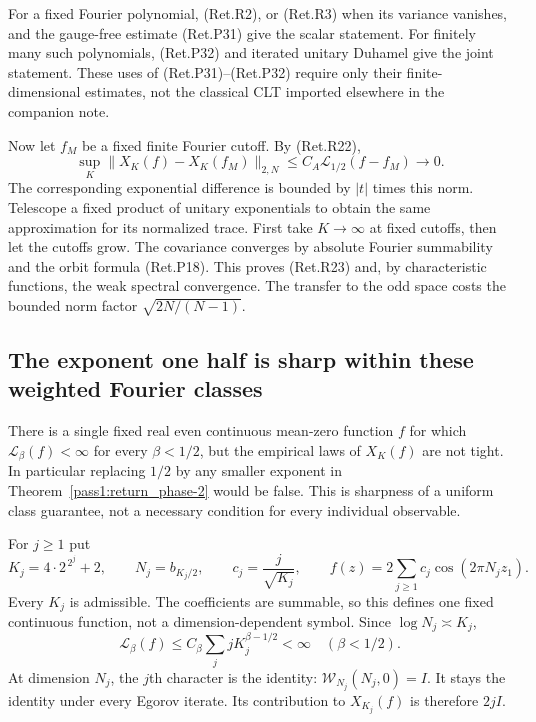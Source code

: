 For a fixed Fourier polynomial, (Ret.R2), or (Ret.R3) when its variance vanishes,
and the gauge-free estimate (Ret.P31) give the scalar statement.
For finitely many such polynomials,
(Ret.P32) and iterated unitary Duhamel give the joint statement.
These uses of (Ret.P31)--(Ret.P32) require only their finite-dimensional estimates,
not the classical CLT imported elsewhere in the companion note.

Now let \(f_M\) be a fixed finite Fourier cutoff. By (Ret.R22),
\[
 \sup_K\|X_K(f)-X_K(f_M)\|_{2,N}
                          \le C_A\mathcal L_{1/2}(f-f_M)\to0.
\]
The corresponding exponential difference is bounded by \(|t|\) times
this norm. Telescope a fixed product of unitary exponentials to obtain
the same approximation for its normalized trace.
First take \(K\to\infty\) at fixed cutoffs, then let the cutoffs grow.
The covariance converges by absolute Fourier summability and the
orbit formula (Ret.P18). This proves (Ret.R23) and, by characteristic functions,
the weak spectral convergence. The transfer to the odd space costs
the bounded norm factor \(\sqrt{2N/(N-1)}\).

\hypertarget{the-exponent-one-half-is-sharp-within-these-weighted-fourier-classes}{%
\subsection{The exponent one half is sharp within these weighted Fourier classes}\label{the-exponent-one-half-is-sharp-within-these-weighted-fourier-classes}}

\begin{theorem}\label{pass1:return_phase-3} There is a single fixed real even continuous mean-zero
function \(f\) for which \(\mathcal L_\beta(f)<\infty\) for every
\(\beta<1/2\), but the empirical laws of \(X_K(f)\) are not tight.
In particular replacing \(1/2\) by any smaller exponent in Theorem~\ref{pass1:return_phase-2}
would be false. This is sharpness of a uniform class guarantee, not
a necessary condition for every individual observable.
\end{theorem}

For \(j\ge1\) put
\[
 K_j=4\cdot2^{\,2^j}+2,\qquad
 N_j=b_{K_j/2},\qquad c_j=\frac j{\sqrt{K_j}},\qquad
 f(z)=2\sum_{j\ge1}c_j\cos(2\pi N_jz_1).                  \tag{Ret.R24}
\]
Every \(K_j\) is admissible. The coefficients are summable, so this
defines one fixed continuous function, not a dimension-dependent symbol.
Since \(\log N_j\asymp K_j\),
\[
 \mathcal L_\beta(f)
      \le C_\beta\sum_j j K_j^{\beta-1/2}<\infty
                                          \quad(\beta<1/2).
\]
At dimension \(N_j\), the \(j\)th character is the identity:
\(\mathcal W_{N_j}(N_j,0)=I\). It stays the identity under every
Egorov iterate. Its contribution to \(X_{K_j}(f)\) is therefore \(2jI\).

